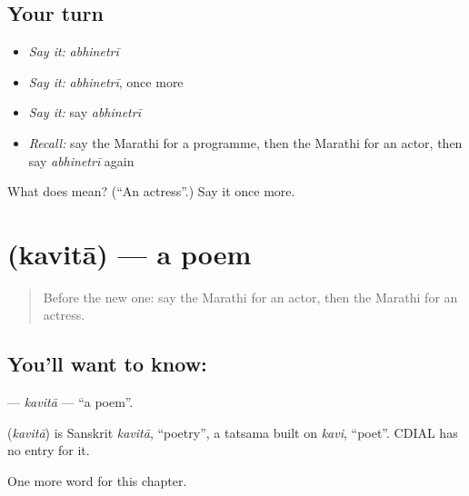 \subsection*{Your turn}
\begin{itemize}
\raggedright
  \item \emph{Say it:} \emph{abhinetrī}
  \item \emph{Say it:} \emph{abhinetrī}, once more
  \item \emph{Say it:} say \emph{abhinetrī}
  \item \emph{Recall:} say the Marathi for a programme, then the Marathi for an actor, then say \emph{abhinetrī} again
\end{itemize}

\begin{tcolorbox}[breakable,colback=teal!4,colframe=teal!35!black,title={Before you move on}]
What does  mean? (\textquotedblleft{}An actress\textquotedblright{}.) Say it once more.
\end{tcolorbox}
\section[\texorpdfstring{\mr{कविता} (kavitā)}{कविता (kavitā)}]{ (kavitā) — a poem}

\label{lesson:MR-C263-kavita}



\begin{quote}
Before the new one: say the Marathi for an actor, then the Marathi for an actress.
\end{quote}

\subsection*{You'll want to know: }
\textbf{} — \emph{kavitā} — \textquotedblleft{}a poem\textquotedblright{}.

\begin{cousinweb}
\textbf{} (\emph{kavitā}) is Sanskrit \emph{kavitā}, \textquotedblleft{}poetry\textquotedblright{}, a tatsama built on \emph{kavi}, \textquotedblleft{}poet\textquotedblright{}. CDIAL has no entry for it.
\end{cousinweb}

\begin{grammarlens}[title={What you've built}]
One more word for this chapter.
\end{grammarlens}

